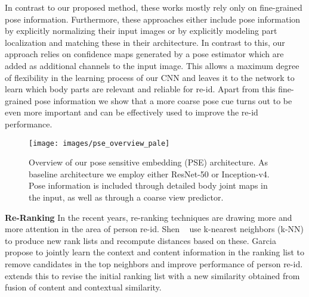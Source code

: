 \documentclass[10pt,twocolumn,letterpaper]{article}
\begin{document}
In contrast to our proposed method, these works mostly rely only on fine-grained pose information. Furthermore, these approaches either include pose information by explicitly normalizing their input images or by explicitly modeling part localization and matching these in their architecture. In contrast to this, our approach relies on confidence maps generated by a pose estimator which are added as additional channels to the input
image. This allows a maximum degree of flexibility in the learning process of our CNN and leaves it to the network to learn which body parts are relevant and reliable for re-id. Apart from this fine-grained pose information we show that a more coarse pose cue turns out to be even more important and can be effectively used to improve the re-id performance.
 

\begin{figure*}
\centering
\texttt{[image: images/pse\_overview\_pale]}
\caption{Overview of our pose sensitive embedding (PSE) architecture. As baseline architecture we employ either ResNet-50 or Inception-v4. Pose information is included through detailed body joint maps in the input, as well as through a coarse view predictor.}
\label{fig:overview}
\vspace{-.4cm}
\end{figure*}
 
 
 
\noindent\textbf{Re-Ranking}
In the recent years, re-ranking techniques are drawing more and more attention in the area of person re-id.
Shen \etal~\cite{shen2012object} use k-nearest neighbors (k-NN) to produce new rank lists and recompute distances based on these. Garcia \etal~\cite{garcia2015person} propose to jointly learn the context and content information in the ranking list to remove candidates in the top neighbors and improve performance of person re-id. \cite{leng2015person} extends this to revise the initial ranking list with a new similarity obtained from fusion of content and contextual similarity.
\end{document}
